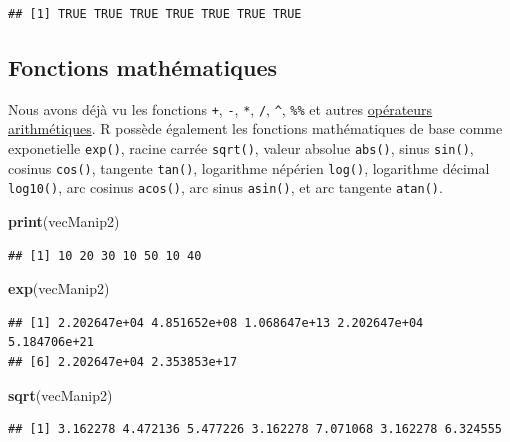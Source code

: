 \documentclass[]{book}
\newenvironment{Shaded}{\begin{snugshade}}{\end{snugshade}}
\newcommand{\KeywordTok}[1]{\textcolor[rgb]{0.13,0.29,0.53}{\textbf{#1}}}
\newcommand{\NormalTok}[1]{#1}
\begin{document}
\begin{verbatim}
## [1] TRUE TRUE TRUE TRUE TRUE TRUE TRUE
\end{verbatim}

\hypertarget{fonctions-mathematiques}{%
\subsection{Fonctions mathématiques}\label{fonctions-mathematiques}}

Nous avons déjà vu les fonctions \texttt{+}, \texttt{-}, \texttt{*}, \texttt{/}, \texttt{\^{}}, \texttt{\%\%} et autres \protect\hyperlink{l011opari}{opérateurs arithmétiques}. R possède également les fonctions mathématiques de base comme exponetielle \texttt{exp()}, racine carrée \texttt{sqrt()}, valeur absolue \texttt{abs()}, sinus \texttt{sin()}, cosinus \texttt{cos()}, tangente \texttt{tan()}, logarithme népérien \texttt{log()}, logarithme décimal \texttt{log10()}, arc cosinus \texttt{acos()}, arc sinus \texttt{asin()}, et arc tangente \texttt{atan()}.

\begin{Shaded}
\begin{Highlighting}[]
\KeywordTok{print}\NormalTok{(vecManip2)}
\end{Highlighting}
\end{Shaded}

\begin{verbatim}
## [1] 10 20 30 10 50 10 40
\end{verbatim}

\begin{Shaded}
\begin{Highlighting}[]
\KeywordTok{exp}\NormalTok{(vecManip2)}
\end{Highlighting}
\end{Shaded}

\begin{verbatim}
## [1] 2.202647e+04 4.851652e+08 1.068647e+13 2.202647e+04 5.184706e+21
## [6] 2.202647e+04 2.353853e+17
\end{verbatim}

\begin{Shaded}
\begin{Highlighting}[]
\KeywordTok{sqrt}\NormalTok{(vecManip2)}
\end{Highlighting}
\end{Shaded}

\begin{verbatim}
## [1] 3.162278 4.472136 5.477226 3.162278 7.071068 3.162278 6.324555
\end{verbatim}
\end{document}
